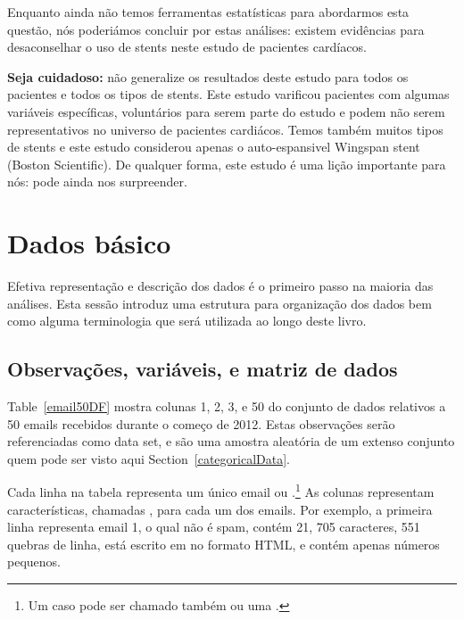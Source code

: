 Enquanto ainda não temos ferramentas estatísticas para abordarmos esta questão, nós poderiámos concluir por estas análises: existem evidências para desaconselhar o uso de stents neste estudo de pacientes cardíacos.

\textbf{Seja cuidadoso:} não generalize os resultados deste estudo para todos os pacientes e todos os tipos de stents. Este estudo varificou pacientes com algumas variáveis específicas, voluntários para serem parte do estudo e podem não serem representativos no universo de pacientes cardiácos. Temos também muitos tipos de stents e este estudo considerou apenas o auto-espansivel Wingspan stent (Boston Scientific). De qualquer forma, este estudo é uma lição importante para nós: pode ainda nos surpreender.


\section[Dados básico]{Dados básico }
\label{dataBasics}

Efetiva representação e descrição dos dados é o primeiro passo na maioria das análises. Esta sessão introduz uma estrutura para organização dos dados bem como alguma terminologia que será utilizada ao longo deste livro.

\subsection{Observações, variáveis, e matriz de dados}


Table~\ref{email50DF} mostra colunas 1, 2, 3, e 50 do conjunto de dados relativos a 50 emails recebidos durante o começo de 2012. Estas observações serão referenciadas como  data set, e são uma amostra aleatória de um extenso conjunto quem pode ser visto aqui Section~\ref{categoricalData}.

Cada linha na tabela representa um único email ou .\footnote{Um caso pode ser chamado também  ou uma .} As colunas representam características, chamadas , para cada um dos emails. Por exemplo, a primeira linha representa email 1, o qual não é spam, contém 21, 705 caracteres, 551 quebras de linha, está escrito em no formato HTML, e contém apenas números pequenos.

